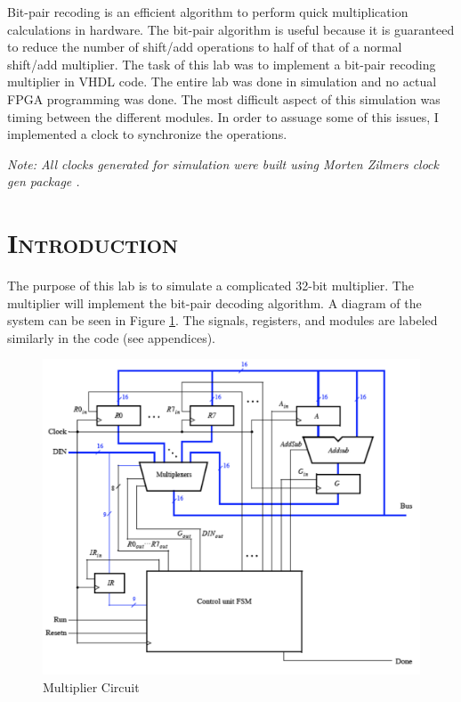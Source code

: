 \documentclass[11pt]{report}
\begin{document}
\begin{spacing}{1.5}
Bit-pair recoding is an efficient algorithm to perform quick multiplication calculations in hardware.  The bit-pair algorithm is useful because it is guaranteed to reduce the number of shift/add operations to half of that of a normal shift/add multiplier.  The task of this lab was to implement a bit-pair recoding multiplier in VHDL code.  The entire lab was done in simulation and no actual FPGA programming was done.  The most difficult aspect of this simulation was timing between the different modules.  In order to assuage some of this issues, I implemented a clock to synchronize the operations.

\vspace{4.5in}

\textit{Note: All clocks generated for simulation were built using Morten Zilmers clock gen package \cite{Synth}.}

\thispagestyle{empty} %
\clearpage
\setcounter{page}{1}

\section*{\scshape Introduction} %
\label{cha:introduction}

The purpose of this lab is to simulate a complicated 32-bit multiplier.  The multiplier will implement the bit-pair decoding algorithm.  A diagram of the system can be seen in Figure \ref{fig:system}.  The signals, registers, and modules are labeled similarly in the code (see appendices).

\vspace{15px}
\begin{figure}[H]
    \centering
    \includegraphics[width=1.0\textwidth,keepaspectratio]{system.png}
    \caption{Multiplier Circuit}
    \label{fig:system}
\end{figure}


\end{spacing}
\end{document}
